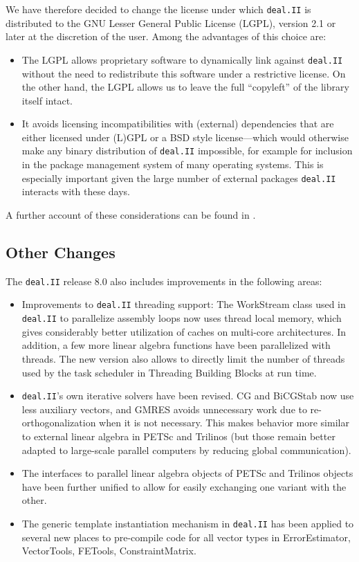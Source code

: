 \documentclass{siamltex}
\newcommand{\specialword}[1]{\texttt{#1}}
\newcommand{\dealii}{{\specialword{deal.II}}}
\begin{document}
We have therefore decided to change the license under which \dealii{} is
distributed to the GNU Lesser General Public License (LGPL), version 2.1 or
later at the discretion of the user. Among the advantages of this choice
are:
\begin{itemize}
  \item The LGPL allows proprietary software to dynamically link against
    \dealii{} without the need to redistribute this software under a
    restrictive license. On the other hand, the LGPL allows us to leave the
    full ``copyleft'' of the library itself intact.
  \item It avoids licensing incompatibilities with (external) dependencies
    that are either licensed under (L)GPL or a BSD style license---which
    would otherwise make any binary distribution of \dealii{} impossible,
    for example for inclusion in the package management system of many
    operating systems. This is especially important given the large number
    of external packages \dealii{} interacts with these days.
\end{itemize}
A further account of these considerations can be found in \cite{BH13}.


\subsection{Other Changes}\label{sec:other}

The \dealii{} release 8.0 also includes improvements in the following areas:

\begin{itemize}
\item Improvements to \dealii{} threading support: The WorkStream class used
  in \dealii{} to parallelize assembly loops now uses thread local memory,
  which gives considerably better utilization of caches on multi-core
  architectures. In addition, a few more linear algebra functions have been
  parallelized with threads. The new version also allows to directly limit the
  number of threads used by the task scheduler in Threading Building Blocks at
  run time.
\item \dealii{}'s own iterative solvers have been revised. CG and BiCGStab now
  use less auxiliary vectors, and GMRES avoids unnecessary work due to
  re-orthogonalization when it is not necessary. This makes behavior more
  similar to external linear algebra in PETSc and Trilinos (but those remain
  better adapted to large-scale parallel computers by reducing global
  communication).
\item The interfaces to parallel linear algebra objects of PETSc and Trilinos
  objects have been further unified to allow for easily exchanging one variant
  with the other.
\item The generic template instantiation mechanism in \dealii{} has been
  applied to several new places to pre-compile code for all vector types in
  ErrorEstimator, VectorTools, FETools, ConstraintMatrix.
\end{itemize}
\end{document}
